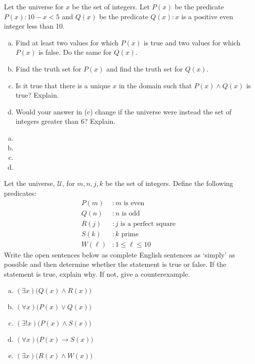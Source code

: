 \documentclass[11pt,letterpaper]{article}
\begin{document}

 Let the universe for $x$ be the set of integers. Let $P(x)$ be the predicate $P(x) \colon 10 - x < 5$ and $Q(x)$ be the predicate $Q(x) \colon x$ is a positive even integer less than 10.
	\begin{enumerate}[(a)]
	\item Find at least two values for which $P(x)$ is true and two values for which $P(x)$ is false. Do the same for $Q(x)$. 
	\item Find the truth set for $P(x)$ and find the truth set for $Q(x)$.
	\item Is it true that there is a unique $x$ in the domain such that $P(x) \wedge Q(x)$ is true? Explain.
	\item Would your answer in (c) change if the universe were instead the set of integers greater than 6? Explain. 
	\end{enumerate} \pspace

\sol 
\begin{enumerate}[(a)]
\item 
\item 
\item 
\item 
\end{enumerate}
	
	

\newpage



 Let the universe, $\mathcal{U}$, for $m, n, j, k$ be the set of integers. Define the following predicates:
	\[
	\begin{aligned}
	P(m) &\colon m \text{ is even} \\
	Q(n) &\colon n \text{ is odd} \\
	R(j) &\colon j \text{ is a perfect square} \\
	S(k) &\colon k \text{ prime} \\
	W(\ell) &\colon 1 \leq \ell \leq 10
	\end{aligned}
	\]
Write the open sentences below as complete English sentences as `simply' as possible and then determine whether the statement is true or false. If the statement is true, explain why. If not, give a counterexample. 
	\begin{enumerate}[(a)]
	\item $(\exists x) \big( Q(x) \wedge R(x) \big)$
	\item $(\forall x) \big( P(x) \vee Q(x) \big)$
	\item $(\exists! x) \big( P(x) \wedge S(x) \big)$
	\item $(\forall x) \big( P(x) \to S(x) \big)$
	\item $(\exists x) \big(R(x) \wedge W(x) \big)$
	\end{enumerate} \pspace
\end{document}
